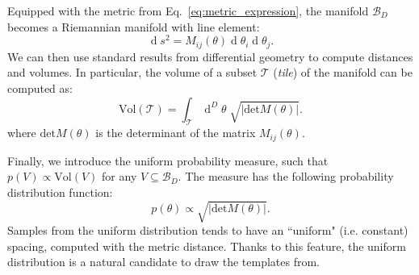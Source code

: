 \documentclass[twocolumn,showpacs,preprintnumbers,nofootinbib,prd,
superscriptaddress,10pt]{revtex4-2}
\renewcommand{\d}[1]{\ensuremath{\operatorname{d}\!{#1}}}
\newcommand{\dvol}[2]{\ensuremath{\operatorname{d}^{#2}\!{#1}}}
\begin{document}

Equipped with the metric from Eq.~\eqref{eq:metric_expression}, the manifold $\mathcal{B}_D$ becomes a Riemannian manifold
with line element:
\begin{equation}\label{eq:line_element}
	\d{s^2} = M_{ij}(\theta) \d{\theta_i} \d{\theta_j}.
\end{equation}
We can then use standard results from differential geometry to compute distances and volumes. In particular, the volume of a subset $\mathcal{T}$ ({\it tile}) of the manifold can be computed as:
\begin{equation}\label{eq:volume_tile}
	\text{Vol}(\mathcal{T}) = \int_\mathcal{T} \dvol{\theta}{D} \; \sqrt{| \text{det}M(\theta)|}.
\end{equation}
where $\text{det}M(\theta)$ is the determinant of the matrix $M_{ij}(\theta)$.

Finally, we introduce the uniform probability measure, such that $p(V) \propto \text{Vol}(V)$ for any $V\subseteq \mathcal{B}_D$. The measure has the following probability distribution function:
\begin{equation}\label{eq:pdf_uniform}
	p(\theta) \propto \sqrt{|\text{det}M(\theta)|}.
\end{equation}
Samples from the uniform distribution tends to have an ``uniform" (i.e. constant) spacing, computed with the metric distance. Thanks to this feature, the uniform distribution is a natural candidate to draw the templates from.
\end{document}
